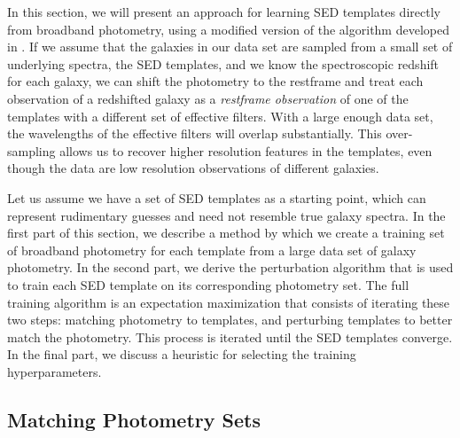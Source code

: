 
\label{sect:template_training}

In this section, we will present an approach for learning SED templates directly from broadband photometry, using a modified version of the algorithm developed in \citet{Budavari2000b}. 
If we assume that the galaxies in our data set are sampled from a small set of underlying spectra, the SED templates, and we know the spectroscopic redshift for each galaxy, we can shift the photometry to the restframe and treat each observation of a redshifted galaxy as a \textit{restframe observation} of one of the templates with a different set of effective filters. 
With a large enough data set, the wavelengths of the effective filters will overlap substantially. 
This over-sampling allows us to recover higher resolution features in the templates, even though the data are low resolution observations of different galaxies.

Let us assume we have a set of SED templates as a starting point, which can represent rudimentary guesses and need not resemble true galaxy spectra. 
In the first part of this section, we describe a method by which we create a training set of broadband photometry for each template from a large data set of galaxy photometry. 
In the second part, we derive the perturbation algorithm that is used to train each SED template on its corresponding photometry set. 
The full training algorithm is an expectation maximization that consists of iterating these two steps: matching photometry to templates, and perturbing templates to better match the photometry.
This process is iterated until the SED templates converge. 
In the final part, we discuss a heuristic for selecting the training hyperparameters.




\subsection{Matching Photometry Sets}
\label{sect:training_sets}
        
